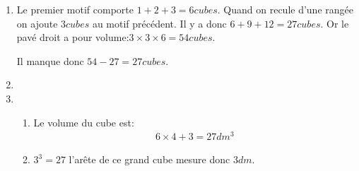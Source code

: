 
\begin{enumerate}
\item Le premier motif comporte $1+2+3=6 cubes$. Quand on recule d'une rangée on ajoute $3 cubes$ au motif précédent. Il y a donc $6+9+12=27 cubes$. Or le pavé droit a pour volume:$3 \times 3 \times 6=54 cubes$.


Il manque donc $54-27=27 cubes$.


\item %

\item 
	\begin{enumerate}
		\item Le volume du cube est:
\begin{align*}
6 \times 4+3=27dm^3
\end{align*}
		\item $3^3=27$ l'arête de ce grand cube mesure donc $3dm$.

	\end{enumerate}
\end{enumerate}
